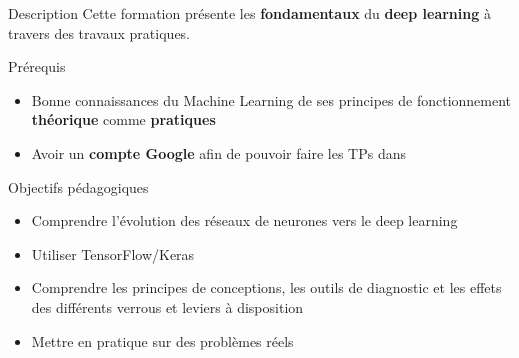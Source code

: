 
\begin{frame}{Description}
  Cette formation présente les \textbf{fondamentaux} du \textbf{deep learning} à travers des travaux pratiques.
\end{frame}


\begin{frame}{Prérequis}
  \begin{itemize}
  \item Bonne connaissances du Machine Learning de ses principes de fonctionnement \textbf{théorique} comme \textbf{pratiques}
  \item Avoir un \textbf{compte Google} afin de pouvoir faire les TPs dans 
  \end{itemize}
\end{frame}

\begin{frame}{Objectifs pédagogiques}
  \begin{itemize}
  \item Comprendre l'évolution des réseaux de neurones vers le deep learning
  \item Utiliser TensorFlow/Keras
  \item Comprendre les principes de conceptions, les outils de diagnostic et les effets des différents verrous et leviers à disposition
  \item Mettre en pratique sur des problèmes réels
  \end{itemize}
\end{frame}

